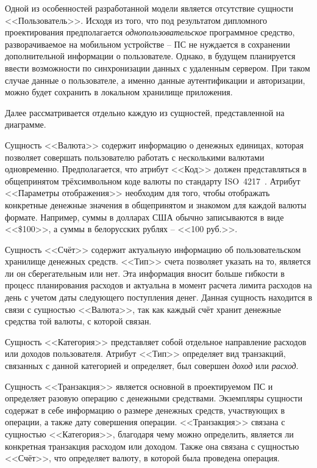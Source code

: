 Одной из особенностей разработанной модели является отсутствие сущности <<Пользователь>>.
Исходя из того, что под результатом дипломного проектирования предполагается \emph{однопользовательское} программное средство, разворачиваемое на мобильном устройстве -- ПС не нуждается в сохранении дополнительной информации о пользователе.
Однако, в будущем планируется ввести возможности по синхронизации данных с удаленным сервером.
При таком случае данные о пользователе, а именно данные аутентификации и авторизации, можно будет сохранить в локальном хранилище приложения.

Далее рассматривается отдельно каждую из сущностей, представленной на диаграмме.

Сущность <<Валюта>> содержит информацию о денежных единицах, которая позволяет совершать пользователю работать с несколькими валютами одновременно.
Предполагается, что атрибут <<Код>> должен представляться в общепринятом трёхсимвольном коде валюты по стандарту ISO~4217~\cite{iso_4217}.
Атрибут <<Параметры отображения>> необходим для того, чтобы отображать конкретные денежные значения в общепринятом и знакомом для каждой валюты формате. Например, суммы в долларах США обычно записываются в виде <<\$100>>, а суммы в белорусских рублях -- <<100 руб.>>.

Сущность <<Счёт>> содержит актуальную информацию об пользовательском хранилище денежных средств.
<<Тип>> счета позволяет указать на то, является ли он сберегательным или нет.
Эта информация вносит больше гибкости в процесс планирования расходов и актуальна в момент расчета лимита расходов на день с учетом даты следующего поступления денег.
Данная сущность находится в связи с сущностью <<Валюта>>, так как каждый счёт хранит денежные средства той валюты, с которой связан.

Сущность <<Категория>> представляет собой отдельное направление расходов или доходов пользователя.
Атрибут <<Тип>> определяет вид транзакций, связанных с данной категорией и определяет, был совершен \emph{доход} или \emph{расход}.

Сущность <<Транзакция>> является основной в проектируемом ПС и определяет разовую операцию с денежными средствами.
Экземпляры сущности содержат в себе информацию о размере денежных средств, участвующих в операции, а также дату совершения операции.
<<Транзакция>> связана с сущностью <<Категория>>, благодаря чему можно определить, является ли конкретная транзакция расходом или доходом.
Также она связана с сущностью <<Счёт>>, что определяет валюту, в которой была проведена операция.

